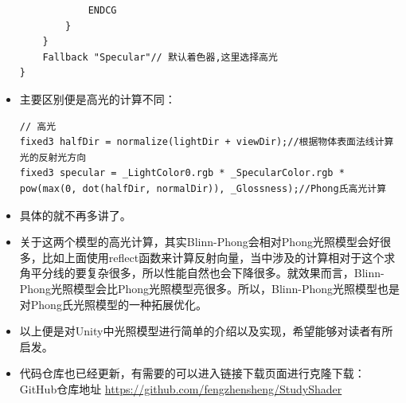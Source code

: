 \documentclass[9pt, b5paper]{article}
\begin{document}
\begin{itemize}
\begin{verbatim}
            ENDCG  
        }  
    }  
    Fallback "Specular"// 默认着色器,这里选择高光  
}
\end{verbatim}
\item 主要区别便是高光的计算不同：
\begin{verbatim}
// 高光  
fixed3 halfDir = normalize(lightDir + viewDir);//根据物体表面法线计算光的反射光方向  
fixed3 specular = _LightColor0.rgb * _SpecularColor.rgb * pow(max(0, dot(halfDir, normalDir)), _Glossness);//Phong氏高光计算
\end{verbatim}
\item 具体的就不再多讲了。
\item 关于这两个模型的高光计算，其实Blinn-Phong会相对Phong光照模型会好很多，比如上面使用reflect函数来计算反射向量，当中涉及的计算相对于这个求角平分线的要复杂很多，所以性能自然也会下降很多。就效果而言，Blinn-Phong光照模型会比Phong光照模型亮很多。所以，Blinn-Phong光照模型也是对Phong氏光照模型的一种拓展优化。
\item 以上便是对Unity中光照模型进行简单的介绍以及实现，希望能够对读者有所启发。
\item 代码仓库也已经更新，有需要的可以进入链接下载页面进行克隆下载：GitHub仓库地址 \url{https://github.com/fengzhensheng/StudyShader}
\end{itemize}
\end{document}
